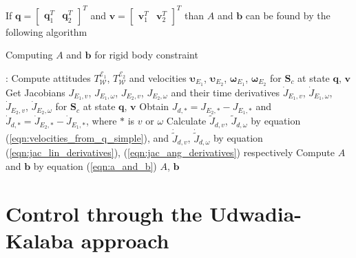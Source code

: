 If $\mathbf{q} = \begin{bmatrix} \mathbf{q}_1^T & \mathbf{q}_2^T \end{bmatrix}^T$ 
and $\mathbf{v} = \begin{bmatrix} \mathbf{v}_1^T & \mathbf{v}_2^T \end{bmatrix}^T$ 
than $A$ and $\mathbf{b}$ can be found by the following algorithm

\begin{algorithm}[H]
    \caption{Computing $A$ and $\mathbf{b}$ for rigid body constraint}

    \begin{algorithmic}[1]
         : 
        \State Compute attitudes $T_{\mathcal{W}}^{\mathcal{E}_1}$,  
        $T_{\mathcal{W}}^{\mathcal{E}_2}$ and velocities 
        $\boldsymbol{\upsilon}_{E_1}$, $\boldsymbol{\upsilon}_{E_2}$, 
        $\boldsymbol{\omega}_{E_1}$, $\boldsymbol{\omega}_{E_2}$ 
        for $\mathbf{S}_c$ at state $\mathbf{q}$, $\mathbf{v}$
        \State Get Jacobians $J_{E_1, v}$, $J_{E_1, \omega}$, 
        $J_{E_2, v}$, $J_{E_2, \omega}$ and their time derivatives
        $\dot{J}_{E_1, v}$, $\dot{J}_{E_1, \omega}$, $\dot{J}_{E_2, v}$, 
        $\dot{J}_{E_2, \omega}$ for $\mathbf{S}_c$ at state $\mathbf{q}$, 
        $\mathbf{v}$
        \State Obtain $J_{d, *} = J_{E_2, *} - J_{E_1, *}$ and 
        $\dot{J}_{d, *} = \dot{J}_{E_2, *} - \dot{J}_{E_1, *}$, where $*$ is 
        $v$ or $\omega$
        \State Calculate $\tilde{J}_{d,v}$, $\tilde{J}_{d, \omega}$ 
        by equation (\ref{eqn:velocities_from_q_simple}), and 
        $\dot{\tilde{J}}_{d,v}$, $\dot{\tilde{J}}_{d, \omega}$ by equation 
        (\ref{eqn:jac_lin_derivatives}), (\ref{eqn:jac_ang_derivatives}) 
        respectively
        \State Compute $A$ and $\mathbf{b}$ by equation (\ref{eqn:a_and_b})
        \State \Return $A$, $\mathbf{b}$
        \EndFunction
    \end{algorithmic}

    \label{alg:get_a_and_b}
\end{algorithm}

\section{Control through the Udwadia-Kalaba approach} 
\label{sec:control_through_udwadia}

